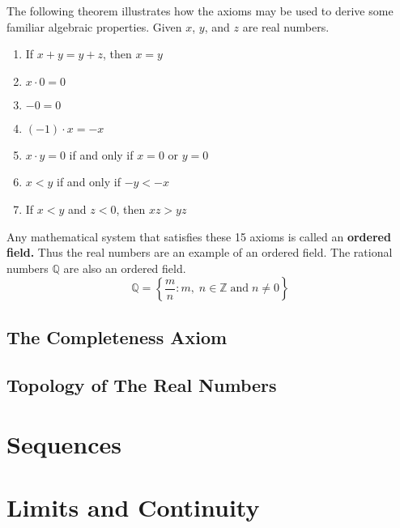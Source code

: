 \documentclass[11pt]{article}
\newcommand{\Q}{\mathbb{Q}}
\newcommand{\Z}{\mathbb{Z}}
\begin{document}
The following theorem illustrates how the axioms may be used to derive some familiar algebraic properties. Given $x$, $y$, and $z$ are real numbers. 
\begin{enumerate}[label = (\alph*)]
\item If $x+y = y+z$, then $x=y$
\item $x\cdot 0 = 0$
\item $-0 = 0$
\item $(-1) \cdot x = -x $
\item $x \cdot y = 0$ if and only if $x=0$ or $y=0$
\item $x<y$ if and only if $-y < -x$
\item If $x<y$ and $z<0$, then $xz>yz$
\end{enumerate}
Any mathematical system that satisfies these 15 axioms is called an \textbf{ordered field.} Thus the real numbers are an example of an ordered field.  The rational numbers $\Q$ are also an ordered field.
$$ \Q = \left\lbrace \frac{m}{n} : m, \; n \in \Z \; \text{and} \; n\neq 0 \right\rbrace$$

\subsection{The Completeness Axiom}

\subsection{Topology of The Real Numbers}


\pagebreak
\section{Sequences}
\section{Limits and Continuity}
\end{document}
